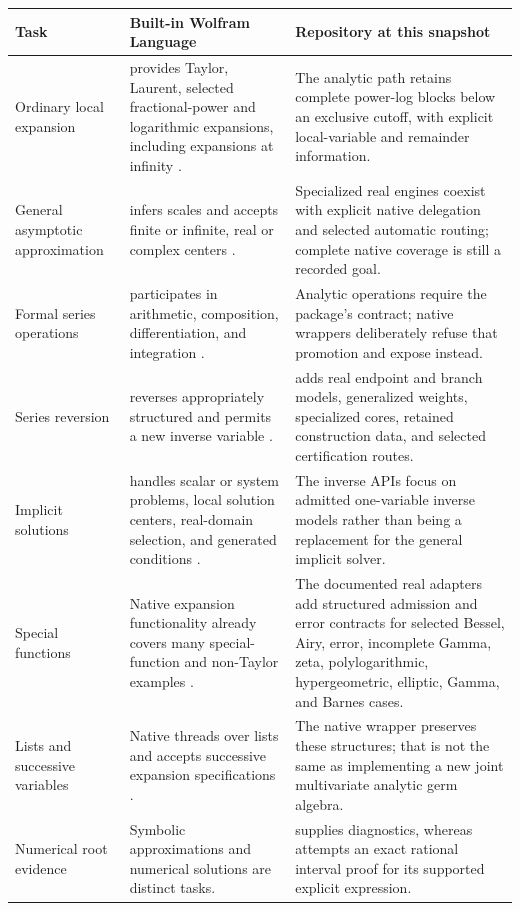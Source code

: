 \documentclass[11pt,letterpaper]{article}
\newcommand{\code}[1]{\texttt{\detokenize{#1}}}
\begin{document}
\begin{longtable}{@{}p{}p{}p{}@{}}
\toprule
Task & Built-in Wolfram Language & Repository at this snapshot\\\midrule\endhead
Ordinary local expansion & \code{Series} provides Taylor, Laurent, selected fractional-power and logarithmic expansions, including expansions at infinity \cite{wl-series}. & The analytic path retains complete power-log blocks below an exclusive cutoff, with explicit local-variable and remainder information.\\[6pt]
General asymptotic approximation & \code{Asymptotic} infers scales and accepts finite or infinite, real or complex centers \cite{wl-asymptotic}. & Specialized real engines coexist with explicit native delegation and selected automatic routing; complete native coverage is still a recorded goal.\\[6pt]
Formal series operations & \code{SeriesData} participates in arithmetic, composition, differentiation, and integration \cite{wl-seriesdata}. & Analytic operations require the package's contract; native wrappers deliberately refuse that promotion and expose \code{"NativeResult"} instead.\\[6pt]
Series reversion & \code{InverseSeries} reverses appropriately structured \code{SeriesData} and permits a new inverse variable \cite{wl-inverse}. & \code{AsymptoticInverse} adds real endpoint and branch models, generalized weights, specialized cores, retained construction data, and selected certification routes.\\[6pt]
Implicit solutions & \code{AsymptoticSolve} handles scalar or system problems, local solution centers, real-domain selection, and generated conditions \cite{wl-solve}. & The inverse APIs focus on admitted one-variable inverse models rather than being a replacement for the general implicit solver.\\[6pt]
Special functions & Native expansion functionality already covers many special-function and non-Taylor examples \cite{wl-series,wl-asymptotic}. & The documented real adapters add structured admission and error contracts for selected Bessel, Airy, error, incomplete Gamma, zeta, polylogarithmic, hypergeometric, elliptic, Gamma, and Barnes cases.\\[6pt]
Lists and successive variables & Native \code{Series} threads over lists and accepts successive expansion specifications \cite{wl-series}. & The native wrapper preserves these structures; that is not the same as implementing a new joint multivariate analytic germ algebra.\\[6pt]
Numerical root evidence & Symbolic approximations and numerical solutions are distinct tasks. & \code{InverseNumericalCheck} supplies diagnostics, whereas \code{InverseCertificate} attempts an exact rational interval proof for its supported explicit expression.\\
\bottomrule
\end{longtable}
\end{document}
